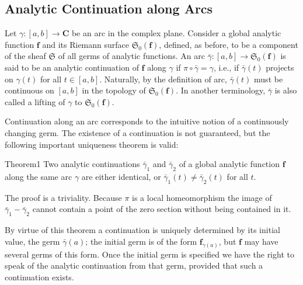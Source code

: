 \setcounter{section}{1}\setcounter{subsection}{3}\subsection{Analytic Continuation along Arcs}\label{sec:8.1.4}
Let $\gamma: [a,b] \to \mathbf{C}$ be an arc in the complex plane. Consider a global analytic function $\mathbf{f}$ and its Riemann surface $\mathfrak{S}_0(\mathbf{f})$, defined, as before, to be a component of the sheaf $\mathfrak{S}$ of all germs of analytic functions. An arc $\bar{\gamma}: [a,b] \to \mathfrak{S}_0(\mathbf{f})$ is said to be an analytic continuation of $\mathbf{f}$ along $\gamma$ if $\pi \circ \bar{\gamma} = \gamma$, i.e., if $\bar{\gamma}(t)$ projects on $\gamma(t)$ for all $t \in [a,b]$. Naturally, by the definition of arc, $\bar{\gamma}(t)$ must be continuous on $[a,b]$ in the topology of $\mathfrak{S}_0(\mathbf{f})$. In another terminology, $\bar{\gamma}$ is also called a lifting of $\gamma$ to $\mathfrak{S}_0(\mathbf{f})$.

Continuation along an arc corresponds to the intuitive notion of a continuously changing germ. The existence of a continuation is not guaranteed, but the following important uniqueness theorem is valid:

\begin{originalstatement}{Theorem}{1}\label{thm:8.1}
Two analytic continuations $\bar{\gamma}_1$ and $\bar{\gamma}_2$ of a global analytic function $\mathbf{f}$ along the same arc $\gamma$ are either identical, or $\bar{\gamma}_1(t) \neq \bar{\gamma}_2(t)$ for all $t$.
\end{originalstatement}
The proof is a triviality. Because $\pi$ is a local homeomorphism the image of $\bar{\gamma}_{1}-\bar{\gamma}_{2}$ cannot contain a point of the zero section without being contained in it.

By virtue of this theorem a continuation is uniquely determined by its initial value, the germ $\bar{\gamma}(a)$; the initial germ is of the form $\mathbf{f}_{\gamma(a)}$, but $\mathbf{f}$ may have several germs of this form. Once the initial germ is specified we have the right to speak of the analytic continuation from that germ, provided that such a continuation exists.

